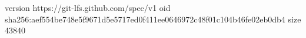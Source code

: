 version https://git-lfs.github.com/spec/v1
oid sha256:aef554be748e5f9671d5e5717ed0f411ee0646972c48f01c104b46fe02eb0db4
size 43840
